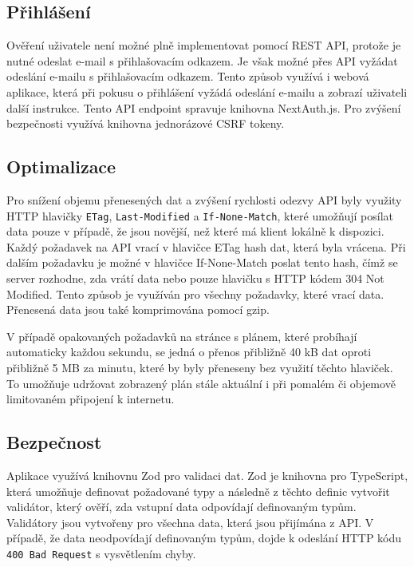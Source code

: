 \subsection{Přihlášení}

Ověření uživatele není možné plně implementovat pomocí REST API, protože je nutné odeslat e-mail s přihlašovacím odkazem.
Je však možné přes API vyžádat odeslání e-mailu s přihlašovacím odkazem. Tento způsob využívá i webová aplikace, která při pokusu o přihlášení
vyžádá odeslání e-mailu a zobrazí uživateli další instrukce. Tento API endpoint spravuje knihovna NextAuth.js. Pro zvýšení bezpečnosti využívá knihovna
jednorázové CSRF tokeny. 

\subsection{Optimalizace}

Pro snížení objemu přenesených dat a zvýšení rychlosti odezvy API byly využity HTTP hlavičky \texttt{ETag}, \texttt{Last-Modified} a \texttt{If-None-Match}, které umožňují
posílat data pouze v případě, že jsou novější, než které má klient lokálně k dispozici.
Každý požadavek na API vrací v hlavičce ETag hash dat, která byla vrácena. Při dalším požadavku je možné v hlavičce If-None-Match poslat tento hash,
čímž se server rozhodne, zda vrátí data nebo pouze hlavičku s HTTP kódem 304 Not Modified. Tento způsob je využíván pro všechny požadavky, které vrací data.
Přenesená data jsou také komprimována pomocí gzip.

V případě opakovaných požadavků na stránce s plánem, které probíhají automaticky každou sekundu, se jedná o přenos přibližně 40 kB dat oproti
přibližně 5 MB za minutu, které by byly přeneseny bez využití těchto hlaviček. To umožňuje udržovat zobrazený plán stále aktuální i při pomalém či objemově limitovaném
připojení k internetu.

\subsection{Bezpečnost}

Aplikace využívá knihovnu Zod pro validaci dat. Zod je knihovna pro TypeScript, která umožňuje definovat požadované typy a následně z těchto definic
vytvořit validátor, který ověří, zda vstupní data odpovídají definovaným typům. Validátory jsou vytvořeny pro všechna data, která jsou přijímána z API.
V případě, že data neodpovídají definovaným typům, dojde k odeslání HTTP kódu \texttt{400 Bad Request} s vysvětlením chyby.

